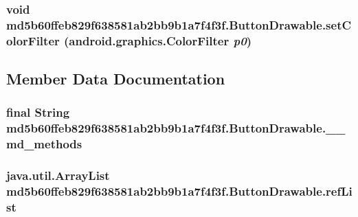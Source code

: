 \hypertarget{classmd5b60ffeb829f638581ab2bb9b1a7f4f3f_1_1_button_drawable_f4559250a88a0e4db90f1f31884febae}{
\subsubsection[{setColorFilter}]{\setlength{\rightskip}{0pt plus 5cm}void md5b60ffeb829f638581ab2bb9b1a7f4f3f.ButtonDrawable.setColorFilter (android.graphics.ColorFilter {\em p0})}}
\label{classmd5b60ffeb829f638581ab2bb9b1a7f4f3f_1_1_button_drawable_f4559250a88a0e4db90f1f31884febae}




\subsection{Member Data Documentation}
\hypertarget{classmd5b60ffeb829f638581ab2bb9b1a7f4f3f_1_1_button_drawable_a04b94d1936232b4a6afd49d724c48c0}{
\subsubsection[{\_\-\_\-md\_\-methods}]{\setlength{\rightskip}{0pt plus 5cm}final String {\bf md5b60ffeb829f638581ab2bb9b1a7f4f3f.ButtonDrawable.\_\-\_\-md\_\-methods}}}
\label{classmd5b60ffeb829f638581ab2bb9b1a7f4f3f_1_1_button_drawable_a04b94d1936232b4a6afd49d724c48c0}


\hypertarget{classmd5b60ffeb829f638581ab2bb9b1a7f4f3f_1_1_button_drawable_e370a961054bb1dae39a194afc0f2751}{
\subsubsection[{refList}]{\setlength{\rightskip}{0pt plus 5cm}java.util.ArrayList {\bf md5b60ffeb829f638581ab2bb9b1a7f4f3f.ButtonDrawable.refList}}}
\label{classmd5b60ffeb829f638581ab2bb9b1a7f4f3f_1_1_button_drawable_e370a961054bb1dae39a194afc0f2751}




